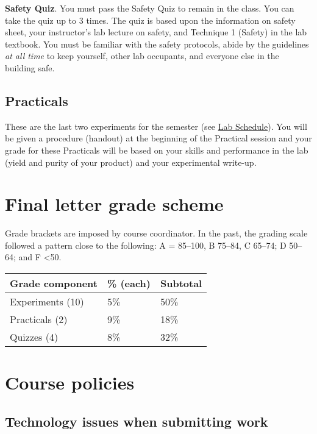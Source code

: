 \textbf{Safety Quiz}. You must pass the Safety Quiz to remain in the
class. You can take the quiz up to 3 times. The quiz is based upon the
information on safety sheet, your instructor's lab lecture on safety,
and Technique 1 (Safety) in the lab textbook. You must be familiar with
the safety protocols, abide by the guidelines \emph{at all time} to keep
yourself, other lab occupants, and everyone else in the building safe.

\hypertarget{practicals}{%
\subsection{Practicals}\label{practicals}}

These are the last two experiments for the semester (see
\href{https://hmlab.page.link/129a-schedule}{Lab Schedule}). You will be
given a procedure (handout) at the beginning of the Practical session
and your grade for these Practicals will be based on your skills and
performance in the lab (yield and purity of your product) and your
experimental write-up.

\hypertarget{final-letter-grade-scheme}{%
\section{Final letter grade scheme}\label{final-letter-grade-scheme}}

Grade brackets are imposed by course coordinator. In the past, the
grading scale followed a pattern close to the following: A = 85--100, B
75--84, C 65--74; D 50--64; and F \textless50.

\begin{longtable}[]{@{}lll@{}}
\toprule
Grade component & \% (each) & Subtotal\tabularnewline
\midrule
\endhead
Experiments (10) & 5\% & 50\%\tabularnewline
Practicals (2) & 9\% & 18\%\tabularnewline
Quizzes (4) & 8\% & 32\%\tabularnewline
\bottomrule
\end{longtable}

\hypertarget{course-policies}{%
\section{Course policies}\label{course-policies}}

\hypertarget{technology-issues-when-submitting-work}{%
\subsection{Technology issues when submitting
work}\label{technology-issues-when-submitting-work}}

